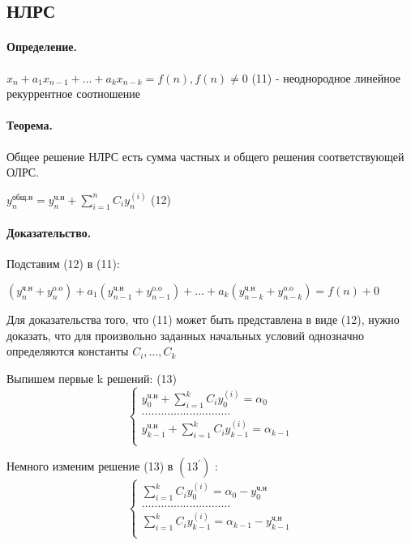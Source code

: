 \documentclass{report}
\begin{document}
\subsection{НЛРС}
\paragraph*{Определение.}
$x_{n} + a_1x_{n-1} + \ldots + a_{k}x_{n-k} = f(n), f(n) \neq 0$ (11) - неоднородное линейное
рекуррентное соотношение

\paragraph*{Теорема.}
Общее решение НЛРС есть сумма частных и общего решения соответствующей ОЛРС.

$y_{n}^{\mbox{общ.н}} = y_{n}^{\mbox{ч.н}} + \sum_{i=1}^{n}C_{i}y_{n}^{(i)}$ (12)

\paragraph*{Доказательство.}
Подставим (12) в (11):

$(y_{n}^{\mbox{ч.н}} + y_{n}^{\mbox{o.o}}) + a_1(y_{n-1}^{\mbox{ч.н}} + y_{n-1}^{\mbox{o.o}}) +
\ldots + a_{k}(y_{n-k}^{\mbox{ч.н}} + y_{n-k}^{\mbox{o.o}}) = 
f(n) + 0$ 

\medskip

Для доказательства того, что (11) может быть представлена в виде (12), нужно доказать,
что для произвольно заданных начальных условий однозначно определяются 
константы $C_{i}, \ldots, C_{k}$ 

\medskip

Выпишем первые k решений: (13)
\[
\begin{cases}
	y_{0}^{\mbox{ч.н}} + \sum_{i=1}^{k}C_{i}y_{0}^{(i)} = \alpha_0 \\
	\ldots.\ldots\ldots.\ldots.\ldots.\ldots\ldots\ldots \\
	y_{k-1}^{\mbox{ч.н}} + \sum_{i=1}^{k}C_{i}y_{k-1}^{(i)} = \alpha_{k-1} \\
\end{cases}
\] 

Немного изменим решение (13) в $(13^{\prime})$ :
\[
\begin{cases}
	\sum_{i=1}^{k}C_{i}y_{0}^{(i)} = \alpha_0 - y_{0}^{\mbox{ч.н}}\\
	\ldots.\ldots\ldots.\ldots.\ldots.\ldots\ldots\ldots \\
	\sum_{i=1}^{k}C_{i}y_{k-1}^{(i)} = \alpha_{k-1} -y_{k-1}^{\mbox{ч.н}}\\
\end{cases}
\] 
\end{document}
